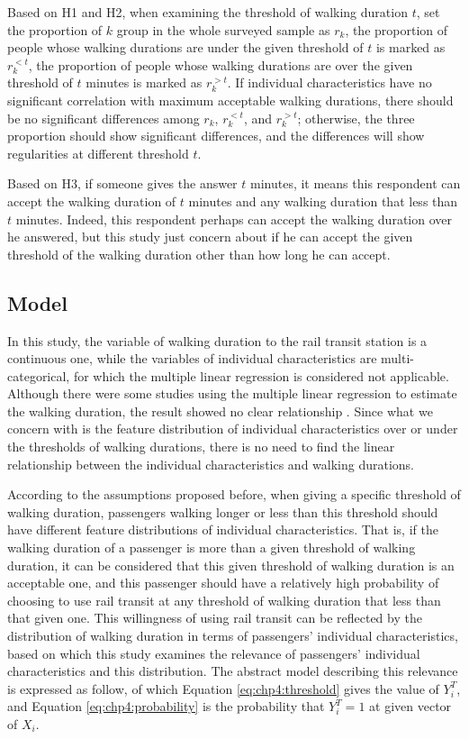 Based on H1 and H2, when examining the threshold of walking duration $t$, set the proportion of $k$ group in the whole surveyed sample as $r_k$, the proportion of people whose walking durations are under the given threshold of $t$ is marked as $r_{k}^{<t}$, the proportion of people whose walking durations are over the given threshold of $t$ minutes is marked as $r_{k}^{>t}$. If individual characteristics have no significant correlation with maximum acceptable walking durations, there should be no significant differences among $r_k$, $r_{k}^{<t}$, and $r_{k}^{>t}$; otherwise, the three proportion should show significant differences, and the differences will show regularities at different threshold $t$.

Based on H3, if someone gives the answer $t$ minutes, it means this respondent can accept the walking duration of $t$ minutes and any walking duration that less than $t$ minutes. Indeed, this respondent perhaps can accept the walking duration over he answered, but this study just concern about if he can accept the given threshold of the walking duration other than how long he can accept.

%
\subsection{Model}
%
In this study, the variable of walking duration to the rail transit station is a continuous one, while the variables of individual characteristics are multi-categorical, for which the multiple linear regression is considered not applicable. Although there were some studies using the multiple linear regression to estimate the walking duration, the result showed no clear relationship \cite{krygsman2004multimodal}. Since what we concern with is the feature distribution of individual characteristics over or under the thresholds of walking durations, there is no need to find the linear relationship between the individual characteristics and walking durations.

%
According to the assumptions proposed before, when giving a specific threshold of walking duration, passengers walking longer or less than this threshold should have different feature distributions of individual characteristics. That is, if the walking duration of a passenger is more than a given threshold of walking duration, it can be considered that this given threshold of walking duration is an acceptable one, and this passenger should have a relatively high probability of choosing to use rail transit at any threshold of walking duration that less than that given one. This willingness of using rail transit can be reflected by the distribution of walking duration in terms of passengers' individual characteristics, based on which this study examines the relevance of passengers' individual characteristics and this distribution. The abstract model describing this relevance is expressed as follow, of which Equation \ref{eq:chp4:threshold} gives the value of $Y^T_i$, and Equation \ref{eq:chp4:probability} is the probability that $Y^T_i=1$ at given vector of $X_i$.

